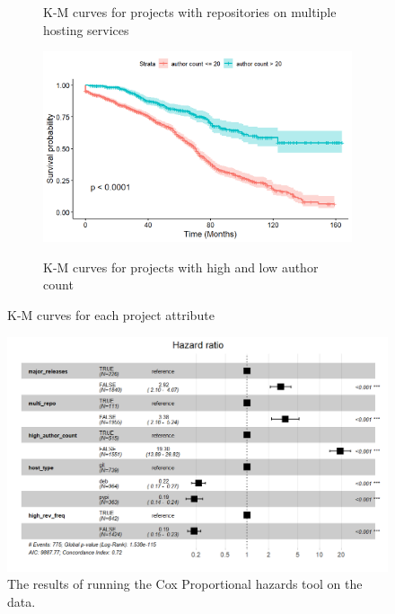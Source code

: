 \documentclass[acmconf]{acmart}
\begin{document}
\begin{figure}[!ht]
\begin{subfigure}[b]{0.45\columnwidth}
        \label{fig:multi_repo}
        \caption{\small K-M curves for projects with repositories on multiple hosting services} 
    \end{subfigure}
    \hfill
    \begin{subfigure}[b]{0.45\columnwidth} 
        \centering 
        \includegraphics[width=\textwidth]{img/KM-author_count.jpg} 
        \label{fig:author_count}
        \caption{\small K-M curves for projects with high and low author count} 
    \end{subfigure}
    \caption{\small K-M curves for each project attribute} 
    \label{fig:KM curves}
\end{figure}

\begin{figure}[!ht]
\centering
\includegraphics[scale=0.5]{img/CoxHR-table.jpg}
\caption{The results of running the Cox Proportional hazards tool on the data. }
\label{fig:Cox}
\end{figure}
\end{document}
